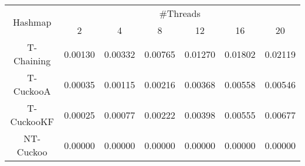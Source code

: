 \begin{tabular}{|c|c|c|c|c|c|c|}
\hline
\multirow{2}{*}{Hashmap} & \multicolumn{6}{c|}{\#Threads}\\\cline{2-7}& 2 & 4 & 8 & 12 & 16 & 20\\
\hline
\hline
T-Chaining & 0.00130 & 0.00332 & 0.00765 & 0.01270 & 0.01802 & 0.02119\\
T-CuckooA & 0.00035 & 0.00115 & 0.00216 & 0.00368 & 0.00558 & 0.00546\\
T-CuckooKF & 0.00025 & 0.00077 & 0.00222 & 0.00398 & 0.00555 & 0.00677\\
NT-Cuckoo & 0.00000 & 0.00000 & 0.00000 & 0.00000 & 0.00000 & 0.00000\\
\hline
\end{tabular}
